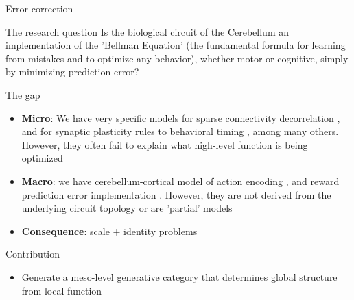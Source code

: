 \documentclass[aspectratio=169]{beamer}
\begin{document}
\begin{frame}{Error correction}
	\end{frame}
	
	\begin{frame}{The research question}
		\large{Is the biological circuit of the Cerebellum an implementation of the 'Bellman Equation' (the fundamental formula for learning from mistakes and to optimize any behavior), whether motor or cognitive, simply by minimizing prediction error?}
	\end{frame}
	
	\begin{frame}{The gap}
		\begin{itemize}
			\item \textbf{Micro}: We have very specific models for sparse connectivity decorrelation \parencite{cayco-gajicSparseSynapticConnectivity2017}, and for synaptic plasticity rules to behavioral timing \parencite{suvrathanTimingRulesSynaptic2016}, among many others. However, they often fail to explain what high-level function is being optimized
			\item \textbf{Macro}: we have cerebellum-cortical model of action encoding \parencite{herzfeldEncodingActionPurkinje2015}, and reward prediction error implementation \parencite{heffleyClassicalConditioningDrives2019}. However, they are not derived from the underlying circuit topology or are 'partial' models
			\item \textbf{Consequence}: scale + identity problems
		\end{itemize}
	\end{frame}
	
	\begin{frame}{Contribution}
		\begin{itemize}
			\item Generate a meso-level generative category that determines global structure from local function
		\end{itemize}
		
	\end{frame}
	
\end{document}
